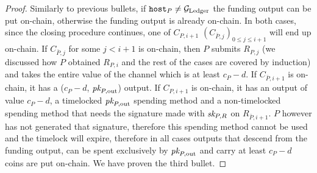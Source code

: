 \begin{proof}
  Similarly to previous bullets, if $\mathtt{host}_P \neq \mathcal{G}_{\mathrm{Ledger}}$ the funding
  output can be put on-chain, otherwise the funding output is already on-chain.
  In both cases, since the closing procedure continues, one of $C_{P, i+1}$
  $(C_{\bar{P}, j})_{0 \leq j \leq i+1}$ will end up on-chain. If $C_{\bar{P},
  j}$ for some $j < i+1$ is on-chain, then $P$ submits $R_{P, j}$ (we discussed
  how $P$ obtained $R_{P, i}$ and the rest of the cases are covered by
  induction) and takes the entire value of the channel which is at least $c_P -
  d$. If $C_{\bar{P}, i+1}$ is on-chain, it has a ($c_P - d$, $\textit{pk}_{P,
  \mathrm{out}}$) output. If $C_{P, i+1}$ is on-chain, it has an output of value
  $c_P - d$, a timelocked $\textit{pk}_{P, \mathrm{out}}$ spending method and a
  non-timelocked spending method that needs the signature made with $\textit{sk}_{P, R}$
  on $R_{\bar{P}, i+1}$. $P$ however has not generated that signature, therefore
  this spending method cannot be used and the timelock will expire, therefore in
  all cases outputs that descend from the funding output, can be spent
  exclusively by $\textit{pk}_{P, \mathrm{out}}$ and carry at least $c_P - d$ coins are
  put on-chain. We have proven the third bullet.


\end{proof}
